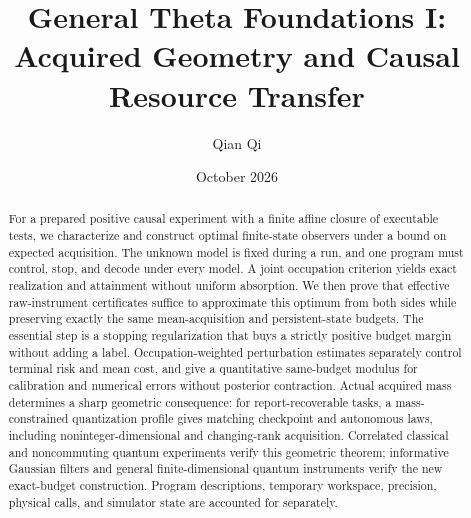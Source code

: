 \documentclass[11pt,reqno]{amsart}
\title[Acquired geometry and causal resource transfer]{General Theta Foundations I:\\Acquired Geometry and Causal Resource Transfer}
\author{Qian Qi}
\date{October 2026}
\numberwithin{equation}{section}
\theoremstyle{definition}
\theoremstyle{remark}
\begin{document}
\begin{abstract}
For a prepared positive causal experiment with a finite affine closure of executable tests, we characterize and construct optimal finite-state observers under a bound on expected acquisition. The unknown model is fixed during a run, and one program must control, stop, and decode under every model. A joint occupation criterion yields exact realization and attainment without uniform absorption. We then prove that effective raw-instrument certificates suffice to approximate this optimum from both sides while preserving exactly the same mean-acquisition and persistent-state budgets. The essential step is a stopping regularization that buys a strictly positive budget margin without adding a label. Occupation-weighted perturbation estimates separately control terminal risk and mean cost, and give a quantitative same-budget modulus for calibration and numerical errors without posterior contraction. Actual acquired mass determines a sharp geometric consequence: for report-recoverable tasks, a mass-constrained quantization profile gives matching checkpoint and autonomous laws, including noninteger-dimensional and changing-rank acquisition. Correlated classical and noncommuting quantum experiments verify this geometric theorem; informative Gaussian filters and general finite-dimensional quantum instruments verify the new exact-budget construction. Program descriptions, temporary workspace, precision, physical calls, and simulator state are accounted for separately.
\end{abstract}
\maketitle










\appendix





\end{document}
